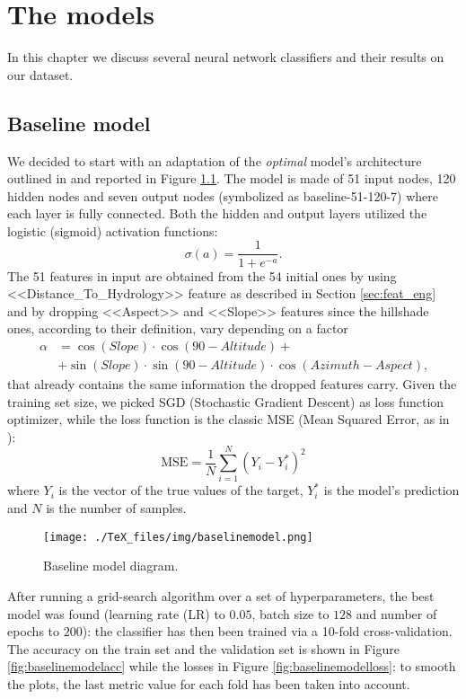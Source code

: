 \chapter{The models}
In this chapter we discuss several neural network classifiers and their results on our dataset.
\section{Baseline model}
\label{sec:baselinemodel}
We decided to start with an adaptation of the \textit{optimal} model's architecture outlined in \cite{blackardDean} and reported in Figure \ref{fig:baselinemodel}. The model is made of 51 input nodes, 120 hidden nodes and seven output nodes (symbolized as baseline-51-120-7) where each layer is fully connected. Both the hidden and output layers utilized the logistic (sigmoid) activation functions:
$$
\sigma(a) = \frac{1}{1 + e^{-a}}\text{.}
$$
The 51 features in input are obtained from the 54 initial ones by using <<Distance\_To\_Hydrology>> feature as described in Section \ref{sec:feat_eng} and by dropping <<Aspect>> and <<Slope>> features since the hillshade ones, according to their definition, vary depending on a factor
$$
\begin{aligned}
\alpha&=\cos(Slope)\cdot \cos(90-Altitude)+ \\
& +\sin(Slope) \cdot \sin(90-Altitude)\cdot \cos(Azimuth-Aspect)\text{,}
\end{aligned}
$$
that already contains the same information the dropped features carry. Given the training set size, we picked SGD (Stochastic Gradient Descent) as loss function optimizer, while the loss function is the classic MSE (Mean Squared Error, as in \cite{blackardDean}):
\begin{equation}
\text{MSE} = \frac{1}{N}\sum_{i=1}^{N}(Y_i - Y^{*}_{i})^2
\end{equation}
where $Y_i$ is the vector of the true values of the target, $Y^{*}_{i}$ is the model's prediction and $N$ is the number of samples.
\begin{figure}
\centering
\texttt{[image: ./TeX\_files/img/baselinemodel.png]}
\caption{Baseline model diagram.}
\label{fig:baselinemodel}
\end{figure}
After running a grid-search algorithm over a set of hyperparameters, the best model was found (learning rate (LR) to $0.05$, batch size to $128$ and number of epochs to $200$): the classifier has then been trained via a 10-fold cross-validation. The accuracy on the train set and the validation set is shown in Figure \ref{fig:baselinemodelacc} while the losses in Figure \ref{fig:baselinemodelloss}: to smooth the plots, the last metric value for each fold has been taken into account.

